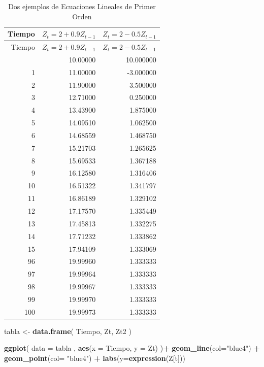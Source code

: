 \documentclass[
]{book}
\newenvironment{Shaded}{\begin{snugshade}}{\end{snugshade}}
\newcommand{\AttributeTok}[1]{\textcolor[rgb]{0.13,0.29,0.53}{#1}}
\newcommand{\FunctionTok}[1]{\textcolor[rgb]{0.13,0.29,0.53}{\textbf{#1}}}
\newcommand{\NormalTok}[1]{#1}
\newcommand{\OtherTok}[1]{\textcolor[rgb]{0.56,0.35,0.01}{#1}}
\newcommand{\SpecialCharTok}[1]{\textcolor[rgb]{0.81,0.36,0.00}{\textbf{#1}}}
\newcommand{\StringTok}[1]{\textcolor[rgb]{0.31,0.60,0.02}{#1}}
\begin{document}
\begin{longtable}[]{@{}rrr@{}}
\caption{\label{tab:table1}Dos ejemplos de Ecuaciones Lineales de Primer Orden}\tabularnewline
\toprule\noalign{}
Tiempo & \(Z_t =2+0.9Z_{t-1}\) & \(Z_t = 2-0.5Z_{t-1}\) \\
\midrule\noalign{}
\endfirsthead
\toprule\noalign{}
Tiempo & \(Z_t =2+0.9Z_{t-1}\) & \(Z_t = 2-0.5Z_{t-1}\) \\
\midrule\noalign{}
\endhead
\bottomrule\noalign{}
\endlastfoot
0 & 10.00000 & 10.000000 \\
1 & 11.00000 & -3.000000 \\
2 & 11.90000 & 3.500000 \\
3 & 12.71000 & 0.250000 \\
4 & 13.43900 & 1.875000 \\
5 & 14.09510 & 1.062500 \\
6 & 14.68559 & 1.468750 \\
7 & 15.21703 & 1.265625 \\
8 & 15.69533 & 1.367188 \\
9 & 16.12580 & 1.316406 \\
10 & 16.51322 & 1.341797 \\
11 & 16.86189 & 1.329102 \\
12 & 17.17570 & 1.335449 \\
13 & 17.45813 & 1.332275 \\
14 & 17.71232 & 1.333862 \\
15 & 17.94109 & 1.333069 \\
96 & 19.99960 & 1.333333 \\
97 & 19.99964 & 1.333333 \\
98 & 19.99967 & 1.333333 \\
99 & 19.99970 & 1.333333 \\
100 & 19.99973 & 1.333333 \\
\end{longtable}

\begin{Shaded}
\begin{Highlighting}[]
\NormalTok{tabla }\OtherTok{\textless{}{-}} \FunctionTok{data.frame}\NormalTok{( Tiempo, Zt, Zt2 )}

\FunctionTok{ggplot}\NormalTok{( }\AttributeTok{data =}\NormalTok{ tabla , }\FunctionTok{aes}\NormalTok{(}\AttributeTok{x =}\NormalTok{ Tiempo, }\AttributeTok{y =}\NormalTok{ Zt) )}\SpecialCharTok{+}
  \FunctionTok{geom\_line}\NormalTok{(}\AttributeTok{col=}\StringTok{"blue4"}\NormalTok{) }\SpecialCharTok{+}
  \FunctionTok{geom\_point}\NormalTok{(}\AttributeTok{col=} \StringTok{"blue4"}\NormalTok{) }\SpecialCharTok{+}
  \FunctionTok{labs}\NormalTok{(}\AttributeTok{y=}\FunctionTok{expression}\NormalTok{(Z[t]))}
\end{Highlighting}
\end{Shaded}
\end{document}
